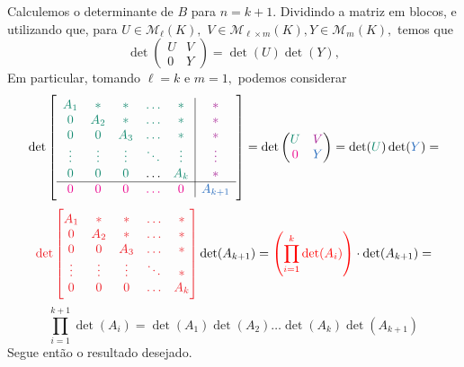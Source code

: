 \documentclass[11pt,a4paper]{article}
\begin{document}
{Calculemos o determinante de $B$ para $n = k +1.$ Dividindo a matriz em blocos, e utilizando que, para $U \in \mathcal{M}_\ell(K),$ $V \in \mathcal{M}_{\ell \times m}(K), Y \in \mathcal{M}_m(K),$ temos que
\[
\det \begin{pmatrix} U & V \\ 0 & Y \end{pmatrix} = \det (U) \det (Y),
\]
Em particular, tomando $\ell = k$ e $m = 1,$ podemos considerar
\[
\det \left[ \begin{array}{ccccc|c}   
\textcolor{PineGreen}{A_1} &\textcolor{PineGreen}{*}  &\textcolor{PineGreen}{*}   &\textcolor{PineGreen}{\ldots} & \textcolor{PineGreen}{*} & \textcolor{Mulberry}{*} \\
\textcolor{PineGreen}{0}& \textcolor{PineGreen}{A_2} &\textcolor{PineGreen}{*}   &\textcolor{PineGreen}{\ldots} &\textcolor{PineGreen}{*} &\textcolor{Mulberry}{*}   \\
\textcolor{PineGreen}{0} &  \textcolor{PineGreen}{0}& \textcolor{PineGreen}{A_3}  &\textcolor{PineGreen}{\ldots}  &\textcolor{PineGreen}{*} &\textcolor{Mulberry}{*}   \\
\textcolor{PineGreen}{\vdots}&  \textcolor{PineGreen}{\vdots}& \textcolor{PineGreen}{\vdots} & \textcolor{PineGreen}{\ddots} &\textcolor{PineGreen}{\vdots}  &\textcolor{Mulberry}{\vdots} \\
\textcolor{PineGreen}{0}& \textcolor{PineGreen}{0}&  \textcolor{PineGreen}{0}&  \ldots & \textcolor{PineGreen}{A_k} &\textcolor{Mulberry}{*}  \\ \hline
\textcolor{Magenta}{0}&  \textcolor{Magenta}{0}&  \textcolor{Magenta}{0} & \textcolor{Magenta}{\ldots} & \textcolor{Magenta}{0} &\textcolor{NavyBlue}{A_{k+1}} \\ 
   \end{array} \right] = \det \begin{pmatrix} \textcolor{PineGreen}{U} & \textcolor{Mulberry}{V} \\ \textcolor{Magenta}{0} & \textcolor{NavyBlue}{Y} \end{pmatrix} = \det (\textcolor{PineGreen}{U}) \det (\textcolor{NavyBlue}{Y})  = \]\[ \textcolor{Red}{\det \begin{bmatrix}
  A_1 &*  &*    &\ldots &*  \\
   0& A_2 &*   &\ldots &*  \\
   0&  0& A_3  &\ldots &*  \\
   \vdots& \vdots& \vdots& \ddots &*  \\
   0&  0&  0&\ldots & A_k
\end{bmatrix} }\det (A_{k+1}) = \textcolor{red}{\left(  \prod\limits_{i=1}^k \det(A_i) \right)} \cdot \det (A_{k+1}) = \]\[ \prod\limits_{i=1}^{k+1} \det(A_i) = \det(A_1)\det(A_2) \ldots \det(A_k)\det(A_{k+1})\]
Segue então o resultado desejado.
}
\end{document}
